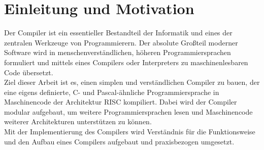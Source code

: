 \chapter{Einleitung und Motivation}
\label{introduction-and-motivation}

Der Compiler ist ein essentieller Bestandteil der Informatik und eines der zentralen Werkzeuge von Programmierern.
Der absolute Großteil moderner Software wird in menschenverständlichen, höheren Programmiersprachen formuliert
und mittels eines Compilers oder Interpreters zu maschinenlesbaren Code übersetzt.\\

Ziel dieser Arbeit ist es, einen simplen und verständlichen Compiler zu bauen, der eine eigens definierte, C- und Pascal-ähnliche Programmiersprache in Maschinencode der Architektur \ac{RISC} kompiliert.
Dabei wird der Compiler modular aufgebaut, um weitere Programmiersprachen lesen und Maschinencode weiterer Architekturen unterstützen zu können.\\
Mit der Implementierung des Compilers wird Verständnis für die Funktionsweise und den Aufbau eines Compilers aufgebaut und praxisbezogen umgesetzt.
